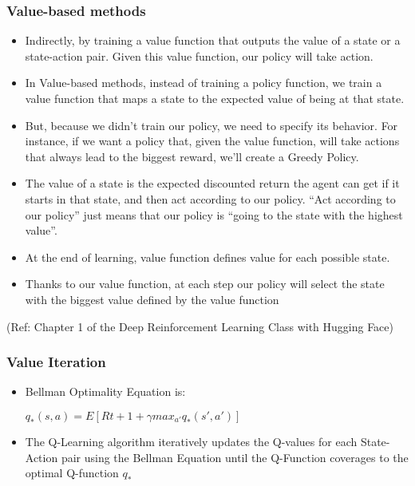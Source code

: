 \begin{frame}[fragile]\frametitle{Value-based methods}

\begin{itemize}
\item Indirectly, by training a value function that outputs the value of a state or a state-action pair. Given this value function, our policy will take action.
\item In Value-based methods, instead of training a policy function, we train a value function that maps a state to the expected value of being at that state.
\item But, because we didn't train our policy, we need to specify its behavior. For instance, if we want a policy that, given the value function, will take actions that always lead to the biggest reward, we'll create a Greedy Policy.
\item The value of a state is the expected discounted return the agent can get if it starts in that state, and then act according to our policy. ``Act according to our policy'' just means that our policy is ``going to the state with the highest value''.
\item At the end of learning, value function defines value for each possible state.
\item Thanks to our value function, at each step our policy will select the state with the biggest value defined by the value function
\end{itemize}


{\tiny (Ref: Chapter 1 of the Deep Reinforcement Learning Class with Hugging Face)}


\end{frame}


\begin{frame}[fragile]\frametitle{Value Iteration}

\begin{itemize}
\item Bellman Optimality Equation is:

$q_{*}(s,a) = E[R{t+1} + \gamma max_{a'} q_{*}(s',a')]$


\item The Q-Learning algorithm iteratively updates the Q-values for each State-Action pair using the Bellman Equation until the Q-Function coverages to the optimal Q-function $q_*$
\end{itemize}

\end{frame}

